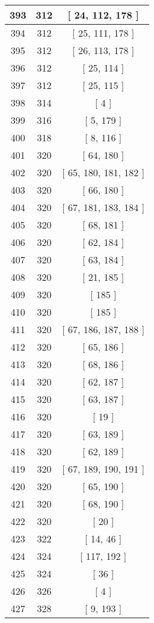 \begin{center}
\begin{longtable}[H]{|| c c c ||}
\hline
393 & 312 & [ 24, 112, 178 ] \\ 
\hline
394 & 312 & [ 25, 111, 178 ] \\ 
\hline
395 & 312 & [ 26, 113, 178 ] \\ 
\hline
396 & 312 & [ 25, 114 ] \\ 
\hline
397 & 312 & [ 25, 115 ] \\ 
\hline
398 & 314 & [ 4 ] \\ 
\hline
399 & 316 & [ 5, 179 ] \\ 
\hline
400 & 318 & [ 8, 116 ] \\ 
\hline
401 & 320 & [ 64, 180 ] \\ 
\hline
402 & 320 & [ 65, 180, 181, 182 ] \\ 
\hline
403 & 320 & [ 66, 180 ] \\ 
\hline
404 & 320 & [ 67, 181, 183, 184 ] \\ 
\hline
405 & 320 & [ 68, 181 ] \\ 
\hline
406 & 320 & [ 62, 184 ] \\ 
\hline
407 & 320 & [ 63, 184 ] \\ 
\hline
408 & 320 & [ 21, 185 ] \\ 
\hline
409 & 320 & [ 185 ] \\ 
\hline
410 & 320 & [ 185 ] \\ 
\hline
411 & 320 & [ 67, 186, 187, 188 ] \\ 
\hline
412 & 320 & [ 65, 186 ] \\ 
\hline
413 & 320 & [ 68, 186 ] \\ 
\hline
414 & 320 & [ 62, 187 ] \\ 
\hline
415 & 320 & [ 63, 187 ] \\ 
\hline
416 & 320 & [ 19 ] \\ 
\hline
417 & 320 & [ 63, 189 ] \\ 
\hline
418 & 320 & [ 62, 189 ] \\ 
\hline
419 & 320 & [ 67, 189, 190, 191 ] \\ 
\hline
420 & 320 & [ 65, 190 ] \\ 
\hline
421 & 320 & [ 68, 190 ] \\ 
\hline
422 & 320 & [ 20 ] \\ 
\hline
423 & 322 & [ 14, 46 ] \\ 
\hline
424 & 324 & [ 117, 192 ] \\ 
\hline
425 & 324 & [ 36 ] \\ 
\hline
426 & 326 & [ 4 ] \\ 
\hline
427 & 328 & [ 9, 193 ] \\ 

\end{longtable}
\end{center}
